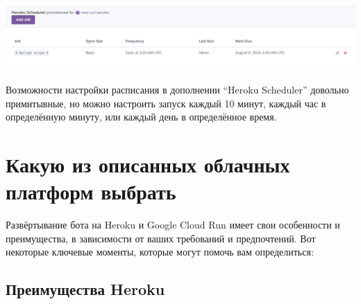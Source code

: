 \documentclass[
]{book}
\begin{document}
\includegraphics{img/9-12.png}

Возможности настройки расписания в дополнении ``Heroku Scheduler'' довольно примитывные, но можно настроить запуск каждый 10 минут, каждый час в определённую минуту, или каждый день в определённое время.

\section{Какую из описанных облачных платформ выбрать}\label{ux43aux430ux43aux443ux44e-ux438ux437-ux43eux43fux438ux441ux430ux43dux43dux44bux445-ux43eux431ux43bux430ux447ux43dux44bux445-ux43fux43bux430ux442ux444ux43eux440ux43c-ux432ux44bux431ux440ux430ux442ux44c}

Развёртывание бота на Heroku и Google Cloud Run имеет свои особенности и преимущества, в зависимости от ваших требований и предпочтений. Вот некоторые ключевые моменты, которые могут помочь вам определиться:

\subsection{Преимущества Heroku}\label{ux43fux440ux435ux438ux43cux443ux449ux435ux441ux442ux432ux430-heroku}
\end{document}
